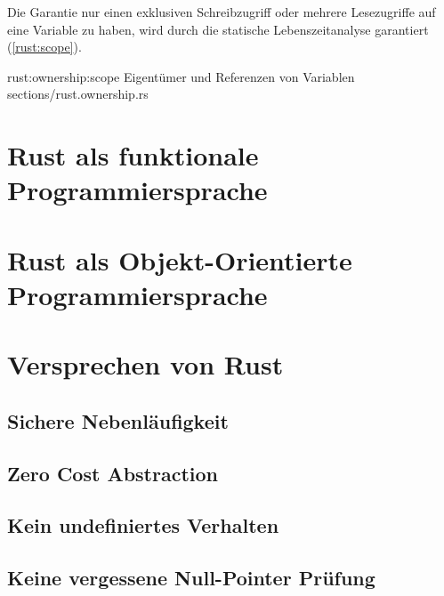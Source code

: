 Die Garantie nur einen exklusiven Schreibzugriff oder mehrere Lesezugriffe auf eine Variable zu haben, wird durch die statische Lebenszeitanalyse garantiert (\autoref{rust:scope}).

\rustcinclude
	{rust:ownership:scope}
	{Eigentümer und Referenzen von Variablen}
	{sections/rust.ownership.rs}



\section{Rust als funktionale Programmiersprache}

\section{Rust als Objekt-Orientierte Programmiersprache}


\section{Versprechen von Rust}
\label{rust:guarantees}
\subsection{Sichere Nebenläufigkeit}
\subsection{Zero Cost Abstraction}
\subsection{Kein undefiniertes Verhalten}
\label{rust:no_unitialized_usage}
\subsection{Keine vergessene Null-Pointer Prüfung}
\label{rust:no_null}

